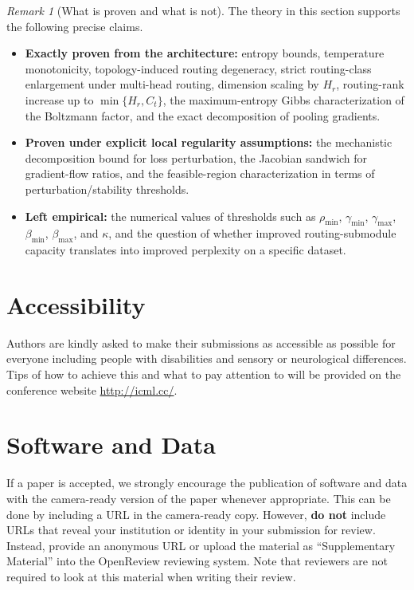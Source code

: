 \documentclass{article}
\theoremstyle{plain}
\theoremstyle{definition}
\theoremstyle{remark}
\newtheorem{remark}[theorem]{Remark}
\begin{document}
\begin{remark}[What is proven and what is not]
\label{rem:what-is-proven}
The theory in this section supports the following precise claims.

\begin{itemize}
    \item \textbf{Exactly proven from the architecture:}
    entropy bounds, temperature monotonicity, topology-induced routing degeneracy, strict routing-class enlargement under multi-head routing, dimension scaling by $H_r$, routing-rank increase up to $\min\{H_r,C_{t}\}$, the maximum-entropy Gibbs characterization of the Boltzmann factor, and the exact decomposition of pooling gradients.

    \item \textbf{Proven under explicit local regularity assumptions:}
    the mechanistic decomposition bound for loss perturbation, the Jacobian sandwich for gradient-flow ratios, and the feasible-region characterization in terms of perturbation/stability thresholds.

    \item \textbf{Left empirical:}
    the numerical values of thresholds such as $\rho_{\min}$, $\gamma_{\min}$, $\gamma_{\max}$, $\beta_{\min}$, $\beta_{\max}$, and $\kappa$, and the question of whether improved routing-submodule capacity translates into improved perplexity on a specific dataset.
\end{itemize}
\end{remark}


\section*{Accessibility}

Authors are kindly asked to make their submissions as accessible as possible
for everyone including people with disabilities and sensory or neurological
differences. Tips of how to achieve this and what to pay attention to will be
provided on the conference website \url{http://icml.cc/}.

\section*{Software and Data}

If a paper is accepted, we strongly encourage the publication of software and
data with the camera-ready version of the paper whenever appropriate. This can
be done by including a URL in the camera-ready copy. However, \textbf{do not}
include URLs that reveal your institution or identity in your submission for
review. Instead, provide an anonymous URL or upload the material as
``Supplementary Material'' into the OpenReview reviewing system. Note that
reviewers are not required to look at this material when writing their review.
\end{document}
